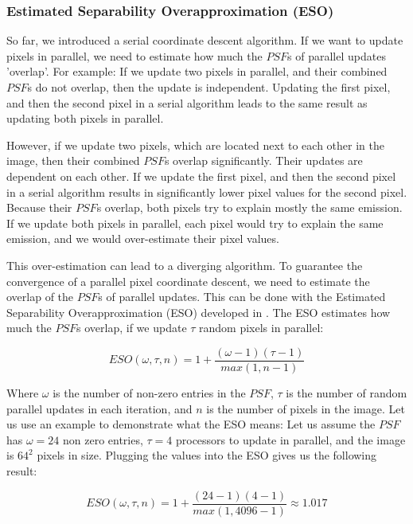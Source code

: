 \subsubsection{Estimated Separability Overapproximation (ESO)} \label{pcdm:pcdm:eso}
So far, we introduced a serial coordinate descent algorithm. If we want to update pixels in parallel, we need to estimate how much the $PSF$s of parallel updates 'overlap'. For example: If we update two pixels in parallel, and their combined $PSF$s do not overlap, then the update is independent. Updating the first pixel, and then the second pixel in a serial algorithm leads to the same result as updating both pixels in parallel. 

However, if we update two pixels, which are located next to each other in the image, then their combined $PSF$s overlap significantly. Their updates are dependent on each other. If we update the first pixel, and then the second pixel in a serial algorithm results in significantly lower pixel values for the second pixel. Because their $PSF$s overlap, both pixels try to explain mostly the same emission. If we update both pixels in parallel, each pixel would try to explain the same emission, and we would over-estimate their pixel values.

This over-estimation can lead to a diverging algorithm. To guarantee the convergence of a parallel pixel coordinate descent, we need to estimate the overlap of the $PSF$s of parallel updates. This can be done with the Estimated Separability Overapproximation (ESO) developed in \cite{richtarik2016parallel}. The ESO estimates how much the $PSF$s overlap, if we update $\tau$ random pixels in parallel:

\begin{equation}\label{pcdm:pcdm:eso}
ESO(\omega, \tau, n) = 1+ \frac{(\omega - 1)(\tau - 1)}{max(1, n -1)}
\end{equation}

Where $\omega$ is the number of non-zero entries in the $PSF$, $\tau$ is the number of random parallel updates in each iteration, and $n$ is the number of pixels in the image. Let us use an example to demonstrate what the ESO means: Let us assume the $PSF$ has $\omega = 24$ non zero entries, $\tau = 4$ processors to update in parallel, and the image is $64^2$ pixels in size. Plugging the values into the ESO gives us the following result:

\begin{equation}
ESO(\omega, \tau, n) = 1+ \frac{(24 - 1)(4 - 1)}{max(1, 4096 -1)} \approx 1.017
\end{equation}


